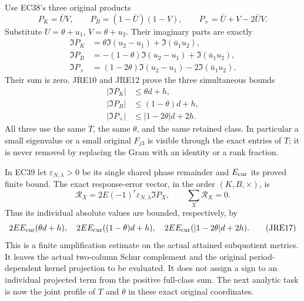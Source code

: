 \documentclass[11pt,a4paper]{article}
\begin{document}
Use EC38's three original products
\[
 P_K=\bar U V,\qquad P_B=(1-\bar U)(1-V),\qquad
 P_\times=\bar U+V-2\bar U V .                                \tag{JRE13}
\]
Substitute $U=\theta+u_1$, $V=\theta+u_2$. Their imaginary parts are
exactly
\[
 \begin{split}
 \Im P_K&=\theta\Im(u_2-u_1)+\Im(\bar u_1u_2),\\
 \Im P_B&=-(1-\theta)\Im(u_2-u_1)+\Im(\bar u_1u_2),\\
 \Im P_\times&=(1-2\theta)\Im(u_2-u_1)-2\Im(\bar u_1u_2).
 \end{split}                                                  \tag{JRE14}
\]
Their sum is zero. JRE10 and JRE12 prove the three simultaneous bounds
\[
 \begin{split}
 |\Im P_K|&\le\theta d+h,\\
 |\Im P_B|&\le(1-\theta)d+h,\\
 |\Im P_\times|&\le|1-2\theta|d+2h .
 \end{split}                                                  \tag{JRE15}
\]
All three use the same $T$, the same $\theta$, and the same retained
class. In particular a small eigenvalue or a small original $F_{j3}$
is visible through the exact entries of $T$; it is never removed
by replacing the Gram with an identity or a rank fraction.

In EC39 let $\varepsilon_{N,\lambda}>0$ be its single shared phase
remainder and $E_{\rm cur}$ its proved finite bound. The exact
response-error vector, in the order $(K,B,\times)$, is
\[
 \mathcal R_X=2E(-1)^r\varepsilon_{N,\lambda}\Im P_X,
 \qquad \sum_X\mathcal R_X=0 .                               \tag{JRE16}
\]
Thus its individual absolute values are bounded, respectively, by
\[
 2EE_{\rm cur}(\theta d+h),\quad
 2EE_{\rm cur}((1-\theta)d+h),\quad
 2EE_{\rm cur}(|1-2\theta|d+2h).                              \tag{JRE17}
\]
This is a finite amplification estimate on the actual attained
subquotient metrics. It leaves the actual two-column Schur complement
and the original period-dependent kernel projection to be evaluated.
It does not assign a sign to an individual projected term from the
positive full-class sum. The next analytic task is now the joint
profile of $T$ and $\theta$ in these exact original coordinates.
\end{document}
